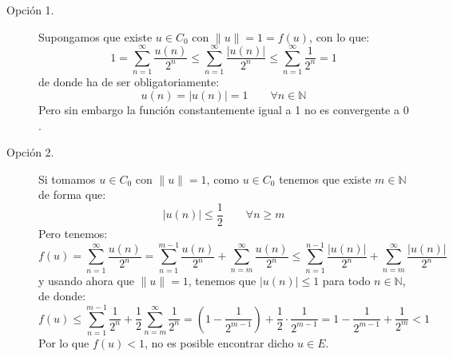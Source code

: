 \begin{ejercicio}
\begin{enumerate}[label=\alph*)]
            \begin{description}
                \item [Opción 1.] Supongamos que existe $u\in C_0$ con $\|u\| = 1 = f(u)$, con lo que:
                    \begin{equation*}
                        1 = \sum_{n=1}^{\infty}\frac{u(n)}{2^n} \leq \sum_{n=1}^{\infty}\frac{|u(n)|}{2^n} \leq \sum_{n=1}^{\infty}\frac{1}{2^n} = 1
                    \end{equation*}
                    de donde ha de ser obligatoriamente:
                    \begin{equation*}
                        u(n) = |u(n)| = 1  \qquad \forall n\in \mathbb{N}
                    \end{equation*}
                    Pero sin embargo la función constantemente igual a 1 no es convergente a $0$.
                \item [Opción 2.] Si tomamos $u\in C_0$ con $\|u\| = 1$, como $u\in C_0$ tenemos que existe $m\in \mathbb{N}$ de forma que:
                    \begin{equation*}
                        |u(n)| \leq \frac{1}{2}\qquad \forall n\geq m
                    \end{equation*}
                    Pero tenemos:
                    \begin{equation*}
                        f(u) = \sum_{n=1}^{\infty}\frac{u(n)}{2^n} = \sum_{n=1}^{m-1} \frac{u(n)}{2^n} + \sum_{n=m}^{\infty}\frac{u(n)}{2^n} \leq \sum_{n=1}^{n-1}\frac{|u(n)|}{2^n} + \sum_{n=m}^{\infty}\frac{|u(n)|}{2^n}
                    \end{equation*}
                    y usando ahora que $\|u\| = 1$, tenemos que $|u(n)| \leq 1$ para todo $n\in \mathbb{N}$, de donde:
                    \begin{equation*}
                        f(u) \leq \sum_{n=1}^{m-1}\frac{1}{2^n} + \frac{1}{2}\sum_{n=m}^{\infty}\frac{1}{2^n} = \left(1-\frac{1}{2^{m-1}}\right) + \frac{1}{2}\cdot \frac{1}{2^{m-1}} = 1-\frac{1}{2^{m-1}} + \frac{1}{2^m} < 1
                    \end{equation*}
                    Por lo que $f(u) < 1$, no es posible encontrar dicho $u\in E$.
            \end{description}
    \end{enumerate}
\end{ejercicio}

